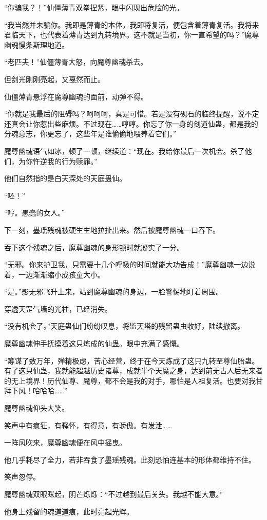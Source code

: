 \begin{this_body}
“你骗我？！”仙僵薄青双拳捏紧，眼中闪现出危险的光。

“我当然并未骗你。我即是薄青的本体，我即将复活，便包含着薄青复活。我将来君临天下，也代表着薄青达到九转境界。这不就是当初，你一直希望的吗？”魔尊幽魂慢条斯理地道。

“老匹夫！”仙僵薄青大怒，向魔尊幽魂杀去。

但剑光刚刚亮起，又戛然而止。

仙僵薄青悬浮在魔尊幽魂的面前，动弹不得。

“你就是我最后的阻碍吗？呵呵呵，真是可惜。若是没有砚石的临终提醒，说不定还真会让你惹出些麻烦。不过现在……哼哼。你忘了你一身的剑道仙蛊，都是我的分魂意志，你更忘了，这些年是谁偷偷地喂养着它们。”

魔尊幽魂语气如冰，顿了一顿，继续道：“现在。我给你最后一次机会。杀了他们，为你忤逆我的行为赎罪。”

他们自然指的是白天深处的天庭蛊仙。

“呸！”

“哼。愚蠢的女人。”

下一刻，墨瑶残魂被硬生生地拉扯出来。然后被魔尊幽魂一口吞下。

吞下这个残魂之后，魔尊幽魂的身形顿时就凝实了一分。

“无邪。你来护卫我，只需要十几个呼吸的时间就能大功告成！”魔尊幽魂一边说着，一边渐渐缩小成孩童大小。

“是。”影无邪飞升上来，站到魔尊幽魂的身边，一脸警惕地盯着周围。

穿透天罡气墙的光柱，已经消失。

“没有机会了。”天庭蛊仙们纷纷叹息，将监天塔的残留蛊虫收好，陆续撤离。

魔尊幽魂伸手抚摸着这只炼成的仙蛊。眼中充满了感慨。

“筹谋了数万年，殚精极虑，苦心经营，终于在今天炼成了这只九转至尊仙胎蛊。有了这只仙蛊，我就能超越历史诸尊，成就半个天魔之身，达到前无古人后无来者的无上境界！历代仙尊、魔尊，都不会是我的对手，哪怕是人祖复活。也要对我甘拜下风！哈哈哈……”

魔尊幽魂仰头大笑。

笑声中有疯狂，有释怀，有得意，有骄傲。有发泄……

一阵风吹来，魔尊幽魂便在风中摇曳。

他几乎耗尽了全力，若非吞食了墨瑶残魂。此刻恐怕连基本的形体都维持不住。

笑声忽停。

魔尊幽魂双眼眯起，阴芒烁烁：“不过越到最后关头。我越不能大意。”

他身上残留的魂道道痕，此时亮起光辉。


\end{this_body}
